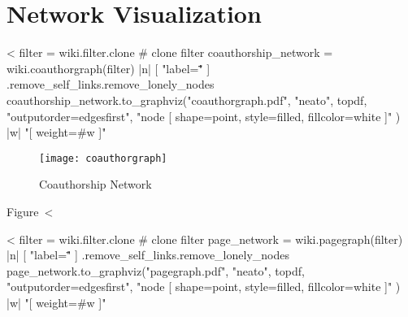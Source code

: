 \documentclass{scrartcl}
\begin{document}
\section{Network Visualization} %
\label{sec:network_visualization}

<%
filter = wiki.filter.clone # clone filter
coauthorship_network = wiki.coauthorgraph(filter) { |n| [ "label=\"\"" ] }.remove_self_links.remove_lonely_nodes
coauthorship_network.to_graphviz("coauthorgraph.pdf", "neato", topdf, "outputorder=edgesfirst", "node [ shape=point, style=filled, fillcolor=white ]" ) { |w|  "[ weight=#{w} ]" }
\begin{figure}[htbp]
	\centering
	\texttt{[image: coauthorgraph]}
	\caption{Coauthorship Network}
	\label{fig:coauthorship_network}
\end{figure}

Figure~<%



<%
filter = wiki.filter.clone # clone filter
page_network = wiki.pagegraph(filter) { |n| [ "label=\"\"" ] }.remove_self_links.remove_lonely_nodes
page_network.to_graphviz("pagegraph.pdf", "neato", topdf, "outputorder=edgesfirst", "node [ shape=point, style=filled, fillcolor=white ]" ) { |w|  "[ weight=#{w} ]" }
\end{document}
